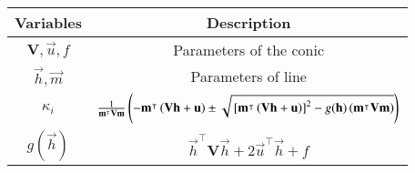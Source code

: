 \begin{tabular}[12pt]{ |c| c|}
    \hline
    \textbf{Variables} & \textbf{Description}\\ 
    \hline
    $\textbf{V}, \vec{u}, f$ & Parameters of the conic \\
    \hline
    $\vec{h}, \vec{m}$ & Parameters of line\\
    \hline
    $\kappa_i$ & $\frac{1}{\mathbf{m}^\intercal\textbf{V}\mathbf{m}}\left(-\mathbf{m}^\intercal\left(\textbf{V}\mathbf{h} + \mathbf{u}\right) \pm \sqrt{{}\left[\mathbf{m}^\intercal\left(\textbf{V}\mathbf{h} + \mathbf{u}\right)\right]^2 - g(\mathbf{h})\left(\mathbf{m}^\intercal\textbf{V}\mathbf{m}\right)}\right)$ \\
    \hline
    $g(\vec{h})$ & $\vec{h}^\intercal\textbf{V}\vec{h} + 2\vec{u}^\intercal\vec{h} + f$ \\
    \hline
    \end{tabular}

